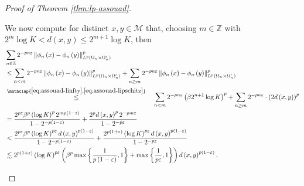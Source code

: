 \documentclass[11pt,reqno]{amsart}
\newcommand{\1}{\mathbf 1}
\begin{document}
\begin{proof}[Proof of Theorem \ref{thm:lp-assouad}]
\begin{enumerate}
We now compute for distinct $x,y\in \mathcal{M}$ that, choosing $m\in \mathbb{Z}$ with $2^m\log K <d\left(x,y\right)\le 2^{m+1}\log K$, then
\begin{align}
\begin{aligned}\label{eq:weierstrass-sum}
    &\sum_{n\in \mathbb{Z}}2^{-pn\varepsilon}\left\|\phi_n\left(x\right)-\phi_n\left(y\right)\right\|_{L^p\left(\Omega_n\times \Omega_n'\right)}^p\\
    &\le \sum_{n<m}2^{-pn\varepsilon}\left\|\phi_n\left(x\right)-\phi_n\left(y\right)\right\|_{L^p\left(\Omega_n\times \Omega_n'\right)}^p+\sum_{n\ge m}2^{-pn\varepsilon}\left\|\phi_n\left(x\right)-\phi_n\left(y\right)\right\|_{L^p\left(\Omega_n\times \Omega_n'\right)}^p\\
    &\stackrel{\mathclap{\eqref{eq:assouad-linfty},\eqref{eq:assouad-lipschitz}}}{\le}\quad \sum_{n<m}2^{-pn\varepsilon}\left(\beta 2^{n+1}\log K\right)^p+\sum_{n\ge m}2^{-pn\varepsilon}\cdot \left(2d\left(x,y\right)\right)^p\\
    &=\frac{2^{p\varepsilon}\beta^p \left(\log K\right)^p2^{m p\left(1-\varepsilon\right)}}{1-2^{-p\left(1-\varepsilon\right)}}+\frac{2^{p} d\left(x,y\right)^p 2^{-pm\varepsilon}}{1-2^{-p\varepsilon}}\\
    &< \frac{2^{p\varepsilon}\beta^p \left(\log K\right)^{p\varepsilon}d\left(x,y\right)^{p\left(1-\varepsilon\right)}}{1-2^{-p\left(1-\varepsilon\right)}}+\frac{2^{p\left(1+\varepsilon\right)}\left(\log K\right)^{p\varepsilon} d\left(x,y\right)^{p\left(1-\varepsilon\right)}}{1-2^{-p\varepsilon}}\\
    &\lesssim 2^{p\left(1+\varepsilon\right)}\left(\log K\right)^{p\varepsilon} \left(\beta^p\max\left\{\frac{1}{p\left(1-\varepsilon\right)},1\right\}+\max\left\{\frac{1}{p\varepsilon},1\right\}\right)d\left(x,y\right)^{p\left(1-\varepsilon\right)}.
    \end{aligned}
\end{align}




\end{enumerate}
\end{proof}
\end{document}
